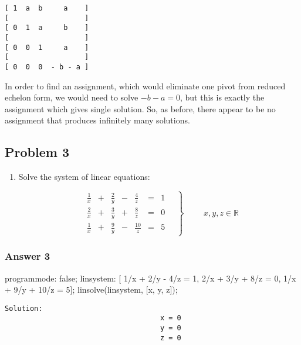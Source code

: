 \documentclass[11pt]{article}
\begin{document}
\begin{verbatim}
[ 1  a  b     a    ]
[                  ]
[ 0  1  a     b    ]
[                  ] 
[ 0  0  1     a    ]
[                  ]
[ 0  0  0  - b - a ]
\end{verbatim}

In order to find an assignment, which would eliminate one pivot from reduced
echelon form, we would need to solve $-b - a = 0$, but this is exactly the
assignment which gives single solution.  So, as before, there appear to be
no assignment that produces infinitely many solutions.
\subsection{Problem 3}
\label{sec-1-3}

\begin{enumerate}
\item Solve the system of linear equations:

\begin{equation*}
  \left.
    \begin{alignedat}{5}
      &  \frac{1}{x} & {}+{} & \frac{2}{y} & {}-{} & \frac{4}{z}  & {}={} & 1 \\
      &  \frac{2}{x} & {}+{} & \frac{3}{y} & {}+{} & \frac{8}{z}  & {}={} & 0 \\
      &  \frac{1}{x} & {}+{} & \frac{9}{y} & {}-{} & \frac{10}{z} & {}={} & 5
    \end{alignedat}
  \quad \right\} \qquad
  \begin{aligned}
    x, y, z \in \mathbb{R}
  \end{aligned}
\end{equation*}
\end{enumerate}

\subsubsection{Answer 3}
\label{sec-1-3-1}

\begin{maxima}
programmode: false;
linsystem: [ 1/x + 2/y -  4/z = 1,
             2/x + 3/y +  8/z = 0,
             1/x + 9/y + 10/z = 5];
linsolve(linsystem, [x, y, z]);
\end{maxima}

\begin{verbatim}
Solution:
                                     x = 0
                                     y = 0
                                     z = 0
\end{verbatim}
\end{document}
